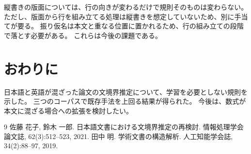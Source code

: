 \documentclass[11pt,a4paper]{article}
\newcommand{\s}[1]{#1}
\begin{document}
\s{縦書きの版面については、行の向きが変わるだけで規則そのものは変わらない。}%
\s{ただし、版面から行を組み立てる処理は縦書きを想定していないため、別に手当てが要る。}%
\s{振り仮名は本文と重なる位置に置かれるため、行の組み立ての段階で落とす必要がある。}%
\s{これらは今後の課題である。}%

\section{おわりに}

\s{日本語と英語が混ざった論文の文境界推定について、学習を必要としない規則を示した。}%
\s{三つのコーパスで既存手法を上回る結果が得られた。}%
\s{今後は、数式が本文に混ざる場合への拡張を検討したい。}%

\begin{thebibliography}{9}
佐藤 花子, 鈴木 一郎. 日本語文書における文境界推定の再検討. 情報処理学会論文誌, 62(3):512--523, 2021.
田中 明. 学術文書の構造解析. 人工知能学会誌, 34(2):88--97, 2019.
\end{thebibliography}
\end{document}
